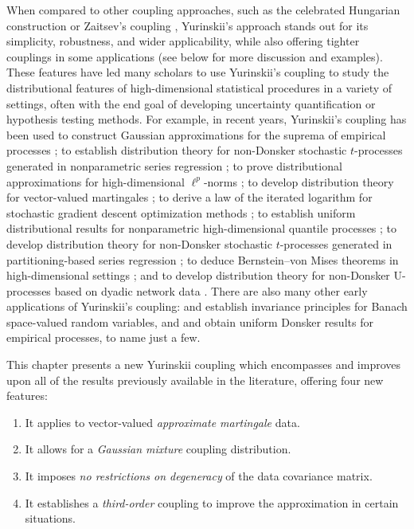 When compared to other coupling approaches, such as the celebrated Hungarian
construction \citep{komlos1975approximation} or Zaitsev's coupling
\citep{zaitsev1987estimates,zaitsev1987gaussian}, Yurinskii's approach stands
out for its simplicity, robustness, and wider applicability, while also
offering tighter couplings in some applications (see below for more discussion
and examples). These features have led many scholars to use Yurinskii's
coupling to study the distributional features of high-dimensional statistical
procedures in a variety of settings, often with the end goal of developing
uncertainty quantification or hypothesis testing methods. For example, in
recent years, Yurinskii's coupling has been used to construct Gaussian
approximations for the suprema of empirical processes
\citep{chernozhukov2014gaussian}; to establish distribution theory for
non-Donsker stochastic $t$-processes generated in nonparametric series
regression \citep{belloni2015some}; to prove distributional approximations for
high-dimensional $\ell^p$-norms \citep{biau2015high}; to develop distribution
theory for vector-valued martingales \citep{belloni2018high,li2020uniform}; to
derive a law of the iterated logarithm for stochastic gradient descent
optimization methods \citep{anastasiou2019normal}; to establish uniform
distributional results for nonparametric high-dimensional quantile processes
\citep{belloni2019conditional}; to develop distribution theory for non-Donsker
stochastic $t$-processes generated in partitioning-based series regression
\citep{cattaneo2020large}; to deduce Bernstein--von Mises theorems in
high-dimensional settings \citep{ray2021bernstein}; and to develop distribution
theory for non-Donsker U-processes based on dyadic network data
\citep{cattaneo2024uniform}. There are also many other early applications of
Yurinskii's coupling: \citet{dudley1983invariance} and \citet{dehling1983limit}
establish invariance principles for Banach space-valued random variables, and
\citet{lecam1988} and \citet{sheehy1992uniform} obtain uniform Donsker results
for empirical processes, to name just a few.

This chapter presents a new Yurinskii coupling which encompasses and improves
upon all of the results previously available in the literature, offering four
new features:
%
\begin{enumerate}[label=(\roman*),leftmargin=*]
  \item
    \label{it:yurinskii_contribution_approximate_martingale}
    It applies to vector-valued \textit{approximate martingale} data.
  \item
    \label{it:yurinskii_contribution_gaussian_mixture}
    It allows for a \textit{Gaussian mixture} coupling distribution.
  \item
    \label{it:yurinskii_contribution_degeneracy}
    It imposes \textit{no restrictions on degeneracy} of the
    data covariance matrix.
  \item
    \label{it:yurinskii_contribution_third_order}
    It establishes a \textit{third-order} coupling to
    improve the approximation in certain situations.
\end{enumerate}
%

